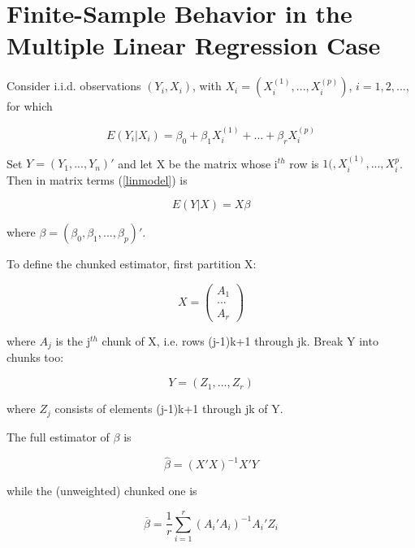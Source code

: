 \section{Finite-Sample Behavior in the Multiple Linear Regression Case}

Consider i.i.d. observations $(Y_i,X_i)$, with
$X_i = (X_i^{(1)},...,X_i^{(p)})$, $i = 1,2,...$, for which

\begin{equation}
\label{linmodel}
E(Y_i | X_i) = \beta_0 + \beta_1 X_i^{(1)} +...+ \beta_r X_i^{(p)}
\end{equation}

Set $Y = (Y_1,...,Y_n)'$ and let X be the matrix whose i$^{th}$ row is
$1(,X_i^{(1)},...,X_i^{p}$.  Then in matrix terms (\ref{linmodel}) is 

\begin{equation}
E(Y | X) = X \beta
\end{equation}

\noindent
where $\beta = (\beta_0,\beta_1,...,\beta_p)'$.

To define the chunked estimator, first partition X:

\begin{equation}
X = 
\left (
   \begin{array}{c}
      A_1 \\
      ... \\
      A_r
   \end{array}
\right )     
\end{equation}

\noindent
where $A_j$ is the j$^{th}$ chunk of X, i.e. rows (j-1)k+1 through
jk.  Break Y into chunks too: 

\begin{equation}
Y = (Z_1,...,Z_r)
\end{equation}

\noindent
where $Z_j$ consists of elements (j-1)k+1 through jk of Y.

The full estimator of $\beta$ is

\begin{equation}
\widehat{\beta} = (X'X)^{-1} X'Y
\end{equation}

\noindent
while the (unweighted) chunked one is

\begin{equation}
\overline{\beta} = \frac{1}{r} \sum_{i=1}^r (A_i'A_i)^{-1} A_i'Z_i
\end{equation}

